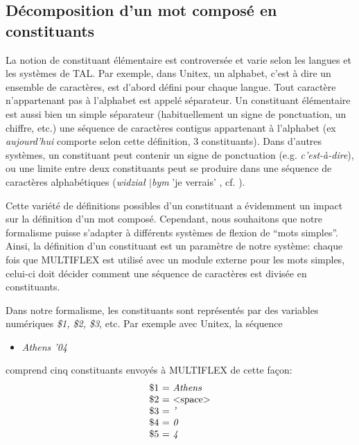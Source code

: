 \subsection{Décomposition d'un mot composé en constituants}
\label{subsec:decomp}
La notion de constituant élémentaire est controversée et varie selon les langues et les systèmes de
TAL. Par exemple, dans Unitex, un alphabet, c'est à dire un ensemble de caractères, est d'abord
défini pour chaque langue.  Tout caractère n'appartenant pas à l'alphabet est appelé séparateur. Un
constituant élémentaire est aussi bien un simple séparateur (habituellement un signe de ponctuation,
un chiffre, etc.) une séquence de caractères contigus appartenant à l'alphabet (ex
\emph{aujourd'hui} comporte selon cette définition, 3 constituants). Dans d'autres systèmes, un
constituant peut contenir un signe de ponctuation (e.g. \emph{c'est-\`a-dire}), ou une limite entre
deux constituants peut se produire dans une séquence de caractères alphabétiques (\emph{widzia\l
$\mid$bym} 'je verrais' , cf.
\cite{PrzepWol03}). 

\bigskip
\noindent Cette variété de définitions possibles d'un constituant a évidemment un impact sur la
définition d'un mot composé. Cependant, nous souhaitons que notre formalisme  puisse s'adapter à
différents systèmes de flexion de ``mots simples''. Ainsi, la définition d'un constituant est un
paramètre de notre système: chaque fois que MULTIFLEX est utilisé avec un module externe pour les
mots simples, celui-ci doit décider comment une séquence de caractères est divisée en constituants.

\bigskip
\noindent Dans notre formalisme, les constituants sont représentés par des variables numériques
\emph{\$1, \$2, \$3}, etc. 
Par exemple avec Unitex, la séquence

\begin{itemize}
\item \emph{Athens '04}
\end{itemize} 

\bigskip
\noindent comprend cinq constituants envoyés à MULTIFLEX de cette façon:
\[
\begin{array}[c]{l}
$\$1 = \emph{Athens}$ \\
$\$2 = $<$space$>$$ \\
$\$3 = \emph{'}$ \\
$\$4 = \emph{0}$ \\
$\$5 = \emph{4}$ \\
\end{array}
\]

